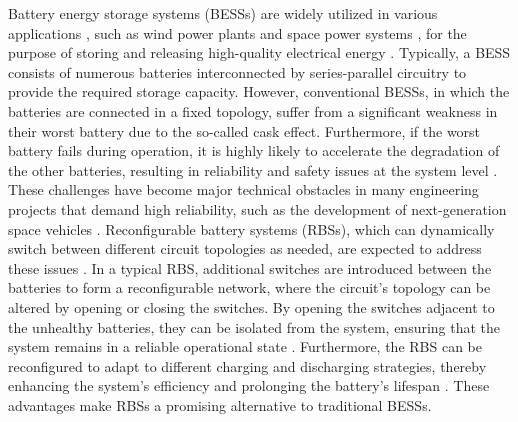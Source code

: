 \documentclass{article}
\begin{document}
Battery energy storage systems (BESSs) are widely utilized in various applications \cite{yangBatteryEnergyStorage2018}, such as wind power plants \cite{desiqueiraControlStrategySmooth2021} and space power systems \cite{schwanbeckInternationalSpaceStation2019,zhangDevelopmentProspectChinese2021}, for the purpose of storing and releasing high-quality electrical energy \cite{choCommercialResearchBattery2015}.
Typically, a BESS consists of numerous batteries interconnected by series-parallel circuitry to provide the required storage capacity.
However, conventional BESSs, in which the batteries are connected in a fixed topology, suffer from a significant weakness in their worst battery due to the so-called cask effect.
Furthermore, if the worst battery fails during operation, it is highly likely to accelerate the degradation of the other batteries, resulting in reliability and safety issues at the system level \cite{yangUnbalancedDischargingAging2016,fengPropagationMechanismsDiagnosis2019,jeevarajanBatterySafetyQualifications2012}.
These challenges have become major technical obstacles in many engineering projects that demand high reliability, such as the development of next-generation space vehicles \cite{pomboHybridPowerSystem2021}.
Reconfigurable battery systems (RBSs), which can dynamically switch between different circuit topologies as needed, are expected to address these issues \cite{hanNextGenerationBatteryManagement2020a}.
In a typical RBS, additional switches are introduced between the batteries to form a reconfigurable network, where the circuit's topology can be altered by opening or closing the switches.
By opening the switches adjacent to the unhealthy batteries, they can be isolated from the system, ensuring that the system remains in a reliable operational state \cite{ci2016reconfigurable}.
Furthermore, the RBS can be reconfigured to adapt to different charging and discharging strategies, thereby enhancing the system's efficiency and prolonging the battery's lifespan \cite{bouchhima2018lifetime}.
These advantages make RBSs a promising alternative to traditional BESSs.
\end{document}

